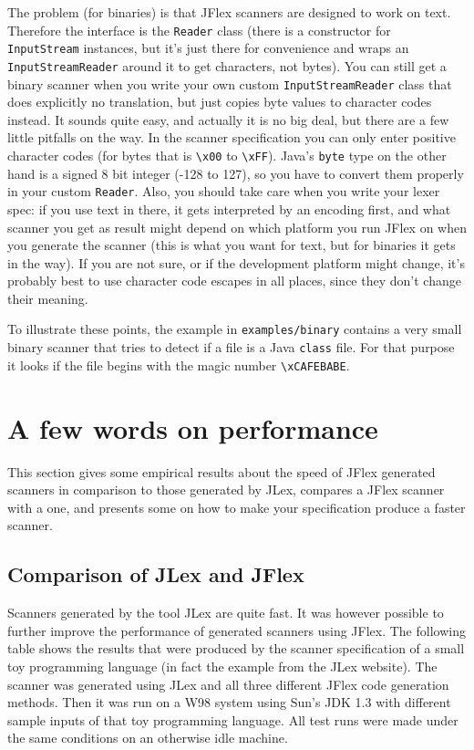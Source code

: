 \documentclass[11pt]{scrartcl}
\begin{document}
The problem (for binaries) is that JFlex scanners are
designed to work on text. Therefore the interface is
the \texttt{Reader} class (there is a constructor
for \texttt{InputStream} instances, but it's just there
for convenience and wraps an \texttt{InputStreamReader}
around it to get characters, not bytes). 
You can still get a binary scanner when you write 
your own custom \texttt{InputStreamReader} class that
does explicitly no translation, but just copies
byte values to character codes instead. It sounds
quite easy, and actually it is no big deal, but there 
are a few little pitfalls on the way. In the scanner
specification you can only enter positive character
codes (for bytes that is \verb+\x00+
to \verb+\xFF+). Java's \texttt{byte} type on the other hand
is a signed 8 bit integer (-128 to 127), so you have to convert 
them properly in your custom \texttt{Reader}. Also, you should
take care when you write your lexer spec: if you
use text in there, it gets interpreted by an encoding
first, and what scanner you get as result might depend
on which platform you run JFlex on when you generate
the scanner (this is what you want for text, but for binaries it
gets in the way). If you are not sure, or if the development
platform might change, it's probably best to use character 
code escapes in all places, since they don't change their
meaning.

To illustrate these points, the example in \texttt{examples/binary} 
contains a very small binary scanner that tries to
detect if a file is a Java \texttt{class} file. For that
purpose it looks if the file begins with the magic number \verb+\xCAFEBABE+.

\section{A few words on performance\label{performance}}
This section gives some empirical results about the speed of JFlex generated
scanners in comparison to those generated by JLex,
compares a JFlex scanner with a  
one, and presents some  on how to make
your specification produce a faster scanner.

\subsection{Comparison of JLex and JFlex\label{PerformanceJLex}}
Scanners generated by the tool JLex are quite fast. It was however
possible to further improve the performance of generated scanners
using JFlex. The following table shows the results that were produced
by the scanner specification of a small toy programming language (in
fact the example from the JLex website). The scanner was generated
using JLex and all three different JFlex code generation methods. Then
it was run on a W98 system using Sun's JDK 1.3 with different sample inputs
of that toy programming language. All test runs were made under the
same conditions on an otherwise idle machine. 
\end{document}
